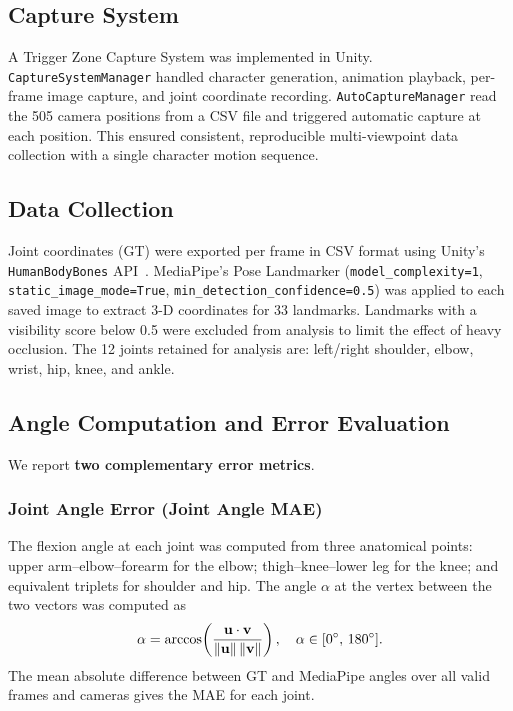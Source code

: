 \documentclass[twocolumn]{article}
\begin{document}
\subsection{Capture System}

A Trigger Zone Capture System was implemented in Unity.
\texttt{CaptureSystemManager} handled character generation, animation
playback, per-frame image capture, and joint coordinate recording.
\texttt{AutoCaptureManager} read the 505 camera positions from a CSV file
and triggered automatic capture at each position. This ensured consistent,
reproducible multi-viewpoint data collection with a single character motion
sequence.

\subsection{Data Collection}

Joint coordinates (GT) were exported per frame in CSV format using Unity's
\texttt{HumanBodyBones} API~\cite{unity}. MediaPipe's Pose Landmarker
(\texttt{model\_complexity=1}, \texttt{static\_image\_mode=True},
\texttt{min\_detection\_confidence=0.5}) was applied to each saved image to
extract 3-D coordinates for 33 landmarks. Landmarks with a visibility score
below 0.5 were excluded from analysis to limit the effect of heavy
occlusion. The 12 joints retained for analysis are: left/right shoulder,
elbow, wrist, hip, knee, and ankle.

\subsection{Angle Computation and Error Evaluation}

We report \textbf{two complementary error metrics}.

\subsubsection{Joint Angle Error (Joint Angle MAE)}

The flexion angle at each joint was computed from three anatomical points:
upper arm--elbow--forearm for the elbow; thigh--knee--lower leg for the knee;
and equivalent triplets for shoulder and hip. The angle $\alpha$ at the
vertex between the two vectors was computed as
\[
  \alpha = \arccos\!\left(\frac{\mathbf{u}\cdot\mathbf{v}}
                               {\|\mathbf{u}\|\,\|\mathbf{v}\|}\right),
  \quad \alpha \in [0\degree{},\,180\degree{}].
\]
The mean absolute difference between GT and MediaPipe angles over all valid
frames and cameras gives the MAE for each joint.
\end{document}
